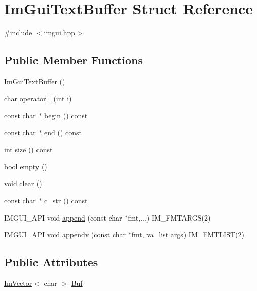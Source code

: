 \hypertarget{struct_im_gui_text_buffer}{}\section{Im\+Gui\+Text\+Buffer Struct Reference}
\label{struct_im_gui_text_buffer}


{\ttfamily \#include $<$imgui.\+hpp$>$}

\subsection*{Public Member Functions}
\begin{DoxyCompactItemize}
\item 
\hyperlink{struct_im_gui_text_buffer_a4c4369c5e65f591554428b947c498d0d}{Im\+Gui\+Text\+Buffer} ()
\item 
char \hyperlink{struct_im_gui_text_buffer_a8550f53463fd12711e3d08b740227bd4}{operator\mbox{[}$\,$\mbox{]}} (int i)
\item 
const char $\ast$ \hyperlink{struct_im_gui_text_buffer_aab6d83c6b9a8061287a4cb6135c1cab4}{begin} () const
\item 
const char $\ast$ \hyperlink{struct_im_gui_text_buffer_a2fc30ad0d384f98dfcea722f798d91f2}{end} () const
\item 
int \hyperlink{struct_im_gui_text_buffer_a2811fcd43e0224eb3bd0f3464b634289}{size} () const
\item 
bool \hyperlink{struct_im_gui_text_buffer_afdef38ae725bb5495f0143170fa902c8}{empty} ()
\item 
void \hyperlink{struct_im_gui_text_buffer_a9e4edc9f950bc9e35d5c3b3071dbc0df}{clear} ()
\item 
const char $\ast$ \hyperlink{struct_im_gui_text_buffer_afb03439bc91723e274bfb9d247a691b9}{c\+\_\+str} () const
\item 
I\+M\+G\+U\+I\+\_\+\+A\+PI void \hyperlink{struct_im_gui_text_buffer_a791ac3e5638c58b53772e14bee1323db}{append} (const char $\ast$fmt,...) I\+M\+\_\+\+F\+M\+T\+A\+R\+GS(2)
\item 
I\+M\+G\+U\+I\+\_\+\+A\+PI void \hyperlink{struct_im_gui_text_buffer_ad7c7e0d7ec1a12dd2a96a3dbb204deaf}{appendv} (const char $\ast$fmt, va\+\_\+list args) I\+M\+\_\+\+F\+M\+T\+L\+I\+ST(2)
\end{DoxyCompactItemize}
\subsection*{Public Attributes}
\begin{DoxyCompactItemize}
\item 
\hyperlink{class_im_vector}{Im\+Vector}$<$ char $>$ \hyperlink{struct_im_gui_text_buffer_aa6de034b1920cdae5505cc58abf14240}{Buf}
\end{DoxyCompactItemize}


